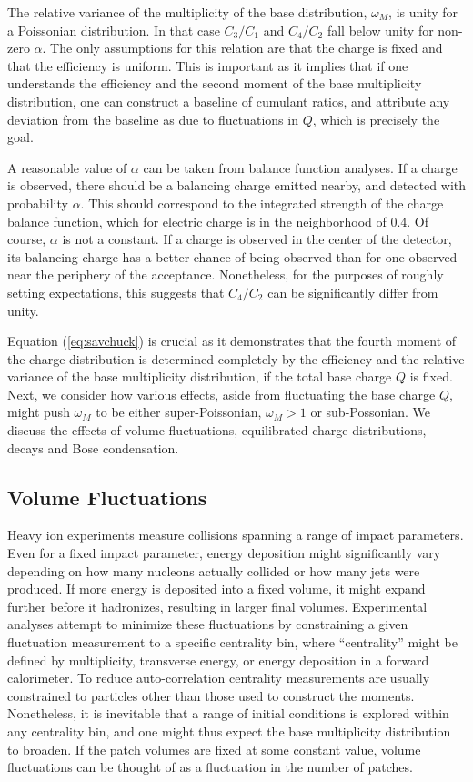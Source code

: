 The relative variance of the multiplicity of the base distribution, $\omega_M$, is unity for a Poissonian distribution. In that case $C_3/C_1$ and $C_4/C_2$ fall below unity for non-zero $\alpha$. The only assumptions for this relation are that the charge is fixed and that the efficiency is uniform. This is important as it implies that if one understands the efficiency and the second moment of the base multiplicity distribution, one can construct a baseline of cumulant ratios, and attribute any deviation from the baseline as due to fluctuations in $Q$, which is precisely the goal.

A reasonable value of $\alpha$ can be taken from balance function analyses. If a charge is observed, there should be a balancing charge emitted nearby, and detected with probability $\alpha$. This should correspond to the integrated strength of the charge balance function, which for electric charge is in the neighborhood of 0.4. Of course, $\alpha$ is not a constant. If a charge is observed in the center of the detector, its balancing charge has a better chance of being observed than for one observed near the periphery of the acceptance. Nonetheless, for the purposes of roughly setting expectations, this suggests that $C_4/C_2$ can be significantly differ from unity. 

Equation (\ref{eq:savchuck}) is crucial as it demonstrates that the fourth moment of the charge distribution is determined completely by the efficiency and the relative variance of the base multiplicity distribution, if the total base charge $Q$ is fixed. Next, we consider how various effects, aside from fluctuating the base charge $Q$, might push $\omega_M$ to be either super-Poissonian, $\omega_M>1$ or sub-Possonian. We discuss the effects of volume fluctuations, equilibrated charge distributions, decays and Bose condensation.

\subsection{Volume Fluctuations}\label{sec:volumefluc}

Heavy ion experiments measure collisions spanning a range of impact parameters. Even for a fixed impact parameter, energy deposition might significantly vary depending on how many nucleons actually collided or how many jets were produced. If more energy is deposited into a fixed volume, it might expand further before it hadronizes, resulting in larger final volumes. Experimental analyses attempt to minimize these fluctuations by constraining a given fluctuation measurement to a specific centrality bin, where ``centrality'' might be defined by multiplicity, transverse energy, or energy deposition in a forward calorimeter. To reduce auto-correlation centrality measurements are usually constrained to particles other than those used to construct the moments. Nonetheless, it is inevitable that a range of initial conditions is explored within any centrality bin, and one might thus expect the base multiplicity distribution to broaden. If the patch volumes are fixed at some constant value, volume fluctuations can be thought of as a fluctuation in the number of patches. 

